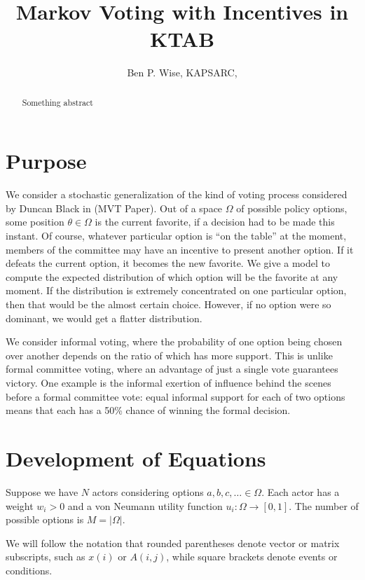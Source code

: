\documentclass[a4paper,10pt]{article}
\title{Markov Voting with Incentives in KTAB}
\author{Ben P. Wise, KAPSARC, \textbf{\color{red}{DRAFT v04}}}
\begin{document}
\maketitle
\thispagestyle{fancy}

\begin{abstract}
Something abstract
\end{abstract}


\section{Purpose}

We consider a stochastic generalization of the kind of voting process considered by Duncan Black in (MVT Paper). Out of a space $\Omega$
  of possible policy options, some position $\theta \in \Omega$
  is the current favorite, if a decision had to be made this instant. Of course, whatever particular option is “on the table” at the moment,
 members of the committee may have an incentive to present another option. If it defeats the current option, it becomes the new favorite. 
We give a model to compute the expected distribution of which option will be the favorite at any moment. If the distribution is extremely
 concentrated on one particular option, then that would be the almost certain choice. However, if no option were so dominant, we would 
get a flatter distribution.

We consider informal voting, where the probability of one option being chosen over another depends on the ratio of which has more support. 
This is unlike formal committee voting, where an advantage of just a single vote guarantees victory. One example is the informal exertion
 of influence behind the scenes before a formal committee vote: equal informal support for each of two options means that each 
has a 50\% chance of winning the formal decision.


\section{Development of Equations}


Suppose we have $N$  actors considering options $a,b,c,\ldots\in\Omega$.
  Each actor has a weight $w_{i} > 0$ and a von Neumann utility function $u_{i}:\Omega\rightarrow[0,1]$.
  The number of possible options is $M=|\Omega|$.

We will follow the notation that rounded  parentheses denote vector or matrix subscripts, such as $x(i)$ or $A(i,j)$, while
square brackets denote events or conditions.
\end{document}
